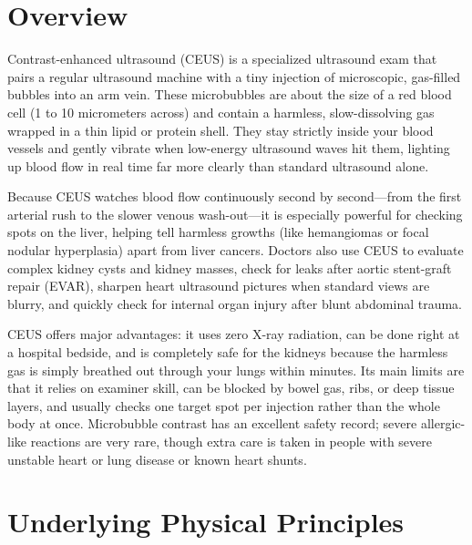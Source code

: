 \label{ch:infographic-ceus}

\section{Overview}

Contrast-enhanced ultrasound (CEUS) is a specialized ultrasound exam that pairs a regular ultrasound machine with a tiny injection of microscopic, gas-filled bubbles into an arm vein. These microbubbles are about the size of a red blood cell (1 to 10 micrometers across) and contain a harmless, slow-dissolving gas wrapped in a thin lipid or protein shell. They stay strictly inside your blood vessels and gently vibrate when low-energy ultrasound waves hit them, lighting up blood flow in real time far more clearly than standard ultrasound alone.

Because CEUS watches blood flow continuously second by second---from the first arterial rush to the slower venous wash-out---it is especially powerful for checking spots on the liver, helping tell harmless growths (like hemangiomas or focal nodular hyperplasia) apart from liver cancers. Doctors also use CEUS to evaluate complex kidney cysts and kidney masses, check for leaks after aortic stent-graft repair (EVAR), sharpen heart ultrasound pictures when standard views are blurry, and quickly check for internal organ injury after blunt abdominal trauma.

CEUS offers major advantages: it uses zero X-ray radiation, can be done right at a hospital bedside, and is completely safe for the kidneys because the harmless gas is simply breathed out through your lungs within minutes. Its main limits are that it relies on examiner skill, can be blocked by bowel gas, ribs, or deep tissue layers, and usually checks one target spot per injection rather than the whole body at once. Microbubble contrast has an excellent safety record; severe allergic-like reactions are very rare, though extra care is taken in people with severe unstable heart or lung disease or known heart shunts.

\section{Underlying Physical Principles}

